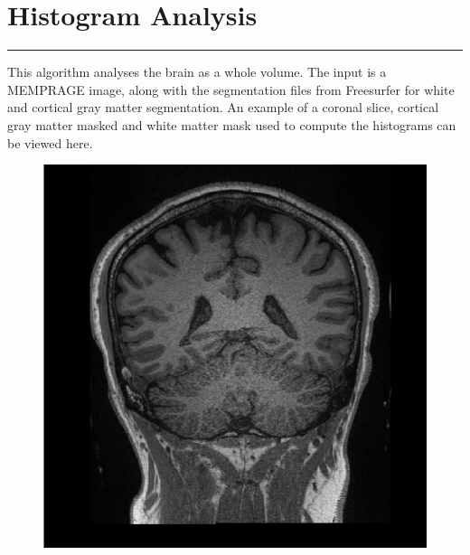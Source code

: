 



\section*{Histogram Analysis}
	\vspace*{-0.4cm}\rule{10cm}{0.1mm}
	
	\Large{This algorithm analyses the brain as a whole volume. The input is a MEMPRAGE image, along with the segmentation files from Freesurfer for white and cortical gray matter segmentation. An example of a coronal slice, cortical gray matter masked and white matter mask used to compute the histograms can be viewed here.} 
	
	\begin{figure}[!h]
        \centering
            \begin{minipage}{0.17\linewidth}
                \includegraphics[width=\textwidth]{figures/full_head.png}
            \end{minipage}
            \begin{minipage}{0.17\linewidth}

\end{minipage}
\end{figure}
